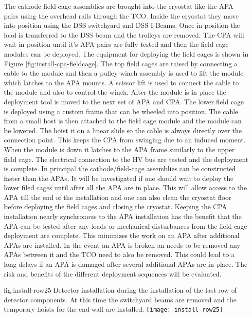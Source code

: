 The cathode field-cage assemblies are brought into the cryostat like the APA pairs using the overhead rails through the TCO. Inside the cryostat they move into position using the DSS switchyard and DSS I-Beams. Once in position the load is transferred to the DSS beam and the trolleys are removed. The CPA will wait in position until it's APA pairs are fully tested and then the field cage modules can be deployed. The equipment for deploying the field cages is shown in Figure \ref{fig:install-cpa-fieldcage}. The top field cages are raised by connecting a cable to the module and then a pulley-winch assembly is used to lift the module which latches to the APA mounts. A scissor lift is used to connect the cable to the module and also to control the winch. After the module is in place the deployment tool is moved to the next set of APA and CPA. The lower field cage is deployed using a custom frame that can be wheeled into position. The cable from a small host  is then attached to the field cage module and the module can be lowered. The hoist it on a linear slide so the cable is always directly over the connection point. This keeps the CPA from swinging due to an induced moment. When the module is down it latches to the APA frame similarly to the upper field cage. The electrical connection to the HV bus are tested and the deployment is complete. In principal the cathode/field-cage assemblies can be constructed faster than the APAs. It will be investigated if one should
wait to deploy the lower filed cages until after all the APA are in place. This will allow access to the APA till the end of the installation and one can also clean the cryostat floor before deploying the field cages and closing the cryostat.
Keeping the CPA installation nearly synchronous to the APA installation has the benefit that the APA can be tested after any loads or mechanical disturbances from the field-cage deployment are complete. This minimizes the work on an APA after additional APAs are installed. In the event an APA is broken an needs to be removed any APAs between it and the TCO need to also be removed. This could lead to a long delays if an APA is damaged after several additional APAs are in place. The risk and benefits of the different deployment sequences will be evaluated.

\begin{dunefigure}{fig:install-row25}
  {Detector installation during the installation of the last row of detector components. At this time the switchyard beams are removed and the temporary hoists for the end-wall are installed.}
\texttt{[image: install-row25]}
\end{dunefigure}


